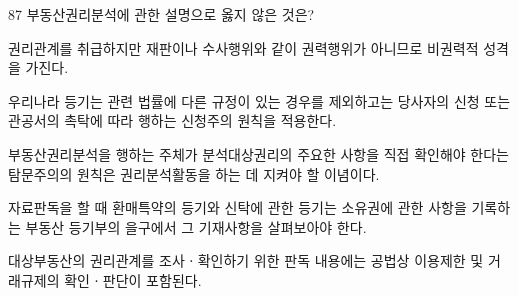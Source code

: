 \begin{question}{87}
부동산권리분석에 관한 설명으로 옳지 않은 것은?
\begin{choices}
  \item 권리관계를 취급하지만 재판이나 수사행위와 같이 권력행위가 아니므로 비권력적 성격을 가진다.
  \item 우리나라 등기는 관련 법률에 다른 규정이 있는 경우를 제외하고는 당사자의 신청 또는 관공서의 촉탁에 따라 행하는 신청주의 원칙을 적용한다.
  \item 부동산권리분석을 행하는 주체가 분석대상권리의 주요한 사항을 직접 확인해야 한다는 탐문주의의 원칙은 권리분석활동을 하는 데 지켜야 할 이념이다.
  \item 자료판독을 할 때 환매특약의 등기와 신탁에 관한 등기는 소유권에 관한 사항을 기록하는 부동산 등기부의 을구에서 그 기재사항을 살펴보아야 한다.
  \item 대상부동산의 권리관계를 조사ㆍ확인하기 위한 판독 내용에는 공법상 이용제한 및 거래규제의 확인ㆍ판단이 포함된다.
\end{choices}
\end{question}
